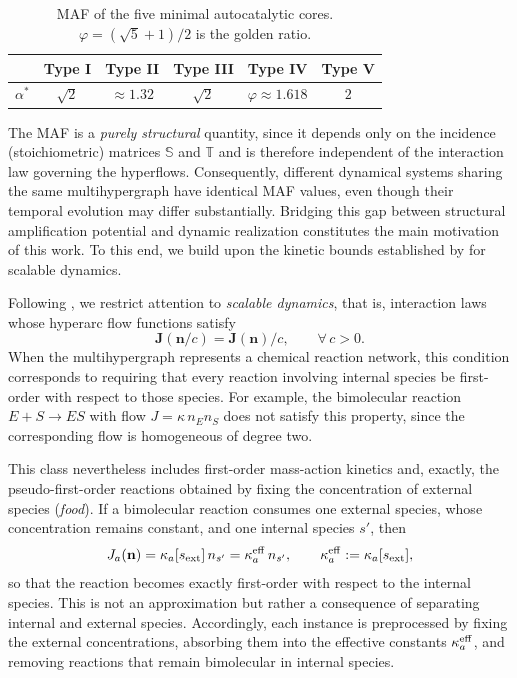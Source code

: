 \documentclass[a4paper,11pt,reqno]{amsart}
\begin{document}
\begin{table}[h]
\centering
\begin{tabular}{lccccc}
\toprule
& Type I & Type II & Type III & Type IV & Type V \\
\midrule
$\alpha^*$ & $\sqrt{2}$ & $\approx 1.32$ & $\sqrt{2}$ &
  $\varphi\approx1.618$ & $2$ \\
\bottomrule
\end{tabular}
\caption{MAF of the five minimal autocatalytic cores. 
  $\varphi=(\sqrt5+1)/2$ is the golden ratio.}
\label{tab:nucleos}
\end{table}
The MAF is a \emph{purely structural} quantity, since it depends only on
the incidence (stoichiometric) matrices $\mathbb{S}$ and $\mathbb{T}$ and is therefore
independent of the interaction law governing the hyperflows. Consequently,
different dynamical systems sharing the same multihypergraph have identical
MAF values, even though their temporal evolution may differ
substantially. Bridging this gap between structural amplification
potential and dynamic realization constitutes the main motivation of this
work. To this end, we build upon the kinetic bounds established by
\citet{gagrani2026topological} for scalable dynamics.

Following \citep{gagrani2026topological}, we restrict attention to
\emph{scalable dynamics}, that is, interaction laws whose hyperarc flow
functions satisfy
$$
\mathbf{J}(\mathbf{n}/c)=\mathbf{J}(\mathbf{n})/c,
\qquad \forall\, c>0.
$$
When the multihypergraph represents a chemical reaction network, this condition
corresponds to requiring that every reaction involving internal species be
first-order with respect to those species. For example, the bimolecular reaction
$E+S\rightarrow ES$ with flow $J=\kappa \,n_E n_S$ does not satisfy this property,
since the corresponding flow is homogeneous of degree two.

This class nevertheless includes first-order mass-action kinetics and,
exactly, the pseudo-first-order reactions obtained by fixing the concentration
of external species (\emph{food}). If a bimolecular reaction consumes one
external species, whose concentration remains constant, and one internal species
$s'$, then
\begin{align}
J_a(\mathbf{n})
=
\kappa_a[s_{\rm ext}]\,n_{s'}
=
\kappa_a^{\rm eff}\,n_{s'},
\qquad
\kappa_a^{\rm eff}:=\kappa_a[s_{\rm ext}],
\end{align}
so that the reaction becomes exactly first-order with respect to the internal
species. This is not an approximation but rather a consequence of separating
internal and external species. Accordingly, each instance is preprocessed by
fixing the external concentrations, absorbing them into the effective constants
$\kappa_a^{\rm eff}$, and removing reactions that remain bimolecular in internal
species.
\end{document}
